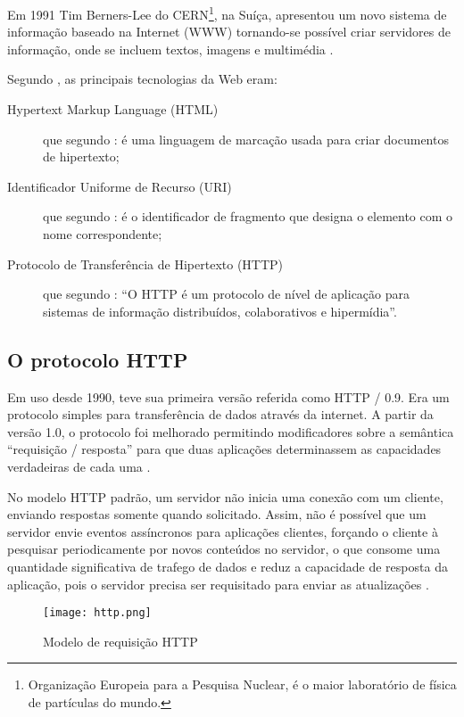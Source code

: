 Em 1991 Tim Berners-Lee do CERN\footnote{Organização Europeia para a Pesquisa Nuclear, é o maior laboratório de física de partículas do mundo.}, na Suíça, apresentou um novo sistema de informação baseado na Internet (WWW) tornando-se possível criar servidores de informação, onde se incluem textos, imagens e multimédia \cite{goethals2000historia}.

Segundo , as principais tecnologias da Web eram:
\begin{description}
	\item[Hypertext Markup Language (HTML)] que segundo : é uma linguagem de marcação usada para criar documentos de hipertexto;

	\item[Identificador Uniforme de Recurso (URI)]  que segundo : é o identificador de fragmento que designa o elemento com o nome correspondente;

	\item[Protocolo de Transferência de Hipertexto (HTTP)] que segundo : “O HTTP é um protocolo de nível de aplicação para sistemas de informação distribuídos, colaborativos e hipermídia”.
\end{description}

\subsection{O protocolo HTTP}
Em uso desde 1990, teve sua primeira versão referida como HTTP / 0.9. Era um protocolo simples para transferência de dados através da internet. A partir da versão 1.0, o protocolo foi melhorado permitindo modificadores sobre a semântica “requisição / resposta” para que duas aplicações determinassem as capacidades verdadeiras de cada uma \cite[p.~7]{Fielding1999}.

No modelo HTTP padrão, um servidor não inicia uma conexão com um cliente, enviando respostas somente quando solicitado. Assim, não é possível que um servidor envie eventos assíncronos para aplicações clientes, forçando o cliente à pesquisar periodicamente por novos conteúdos no servidor, o que consome uma quantidade significativa de trafego de dados e reduz a capacidade de resposta da aplicação, pois o servidor precisa ser requisitado para enviar as atualizações \cite{Loreto2011}.

\begin{figure}[!htb]
	\centering
	\caption{Modelo de requisição HTTP}
	\texttt{[image: http.png]}
	\label{HTTP}
\end{figure}

